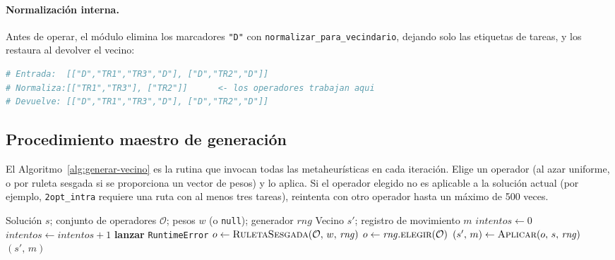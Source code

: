 \paragraph{Normalización interna.}
Antes de operar, el módulo elimina los marcadores \texttt{"D"} con
\texttt{normalizar\_para\_vecindario}, dejando solo las etiquetas de tareas,
y los restaura al devolver el vecino:
\begin{lstlisting}[language=Python]
# Entrada:  [["D","TR1","TR3","D"], ["D","TR2","D"]]
# Normaliza:[["TR1","TR3"], ["TR2"]]      <- los operadores trabajan aqui
# Devuelve: [["D","TR1","TR3","D"], ["D","TR2","D"]]
\end{lstlisting}

\subsection{Procedimiento maestro de generación}
\label{subsec:gen-maestro}

El Algoritmo~\ref{alg:generar-vecino} es la rutina que invocan todas las
metaheurísticas en cada iteración. Elige un operador (al azar uniforme, o
por ruleta sesgada si se proporciona un vector de pesos) y lo aplica. Si el
operador elegido no es aplicable a la solución actual (por ejemplo,
\texttt{2opt\_intra} requiere una ruta con al menos tres tareas), reintenta
con otro operador hasta un máximo de 500 veces.

\begin{algorithm}[h]
\caption{\textsc{GenerarVecino} --- rutina maestra de generación de vecinos}
\label{alg:generar-vecino}
\begin{algorithmic}[1]
\Require Solución $s$; conjunto de operadores $\mathcal{O}$; pesos $w$ (o \texttt{null}); generador $\mathit{rng}$
\Ensure Vecino $s'$; registro de movimiento $m$
\State $\mathit{intentos} \gets 0$
\Repeat
  \State $\mathit{intentos} \gets \mathit{intentos} + 1$
     \State \textbf{lanzar} \texttt{RuntimeError} 
  \EndIf
     \State $o \gets \textsc{RuletaSesgada}(\mathcal{O},\, w,\, \mathit{rng})$ 
  \Else
     \State $o \gets \mathit{rng}.\textsc{elegir}(\mathcal{O})$ 
  \EndIf
  \State $(s',\, m) \gets \textsc{Aplicar}(o,\, s,\, \mathit{rng})$ 
\State \Return $(s',\, m)$
\end{algorithmic}
\end{algorithm}


